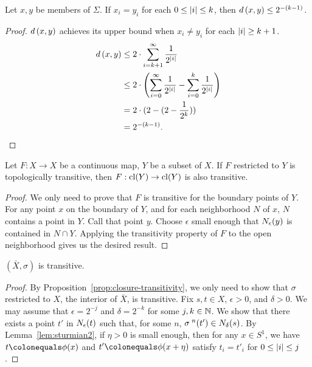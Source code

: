 \documentclass[10pt,twoside,draft]{book}
\begin{document}
\begin{example}
  \begin{proposition}
    Let $x,y$ be members of $\Sigma$.
    If $x_i = y_i$ for each $0 \leq \left | i \right | \leq k$, then $d\left( x,y \right) \leq 2^{-(k-1)}$.
    \label{prop:two-sided}
    \begin{proof}
      $d\left( x,y \right)$ achieves its upper bound when $x_i \neq y_i$ for each $\left | i \right | \geq k+1$.
      \begin{align*}
        d\left( x,y \right)
        &\leq 2 \cdot \sum\limits_{i = k+1}^{\infty} \frac{1}{2^{\left | i \right |}} \\
        &\leq 2 \cdot \left (  \sum\limits_{i = 0}^{\infty} \frac{1}{2^{\left | i \right |}} - \sum\limits_{i = 0}^{k} \frac{1}{2^{\left | i \right |}} \right ) \\
        &= 2 \cdot (2 - (2 - \frac{1}{2^k})) \\
        &= 2^{-(k-1)}.
      \end{align*}
    \end{proof}
  \end{proposition}
  \begin{proposition}
    Let $F: X \to X$ be a continuous map, $Y$ be a subset of $X$.
    If $F$ restricted to $Y$ is topologically transitive, then $F: \mathrm{cl}(Y) \to \mathrm{cl}(Y)$ is also transitive.
    \label{prop:closure-transitivity}
    \begin{proof}
      We only need to prove that $F$ is transitive for the boundary points of $Y$.
      For any point $x$ on the boundary of $Y$, and for each neighborhood $N$ of $x$, $N$ contains a point in $Y$.
      Call that point $y$.
      Choose $\epsilon$ small enough that $N_{\epsilon}(y)$ is contained in $N \cap Y$.
      Applying the transitivity property of $F$ to the open neighborhood gives us the desired result.
    \end{proof}
  \end{proposition}
  \begin{proposition}
    $(\bar{X}, \sigma)$ is transitive.
    \begin{proof}
      By Proposition~\ref{prop:closure-transitivity}, we only need to show that $\sigma$ restricted to $X$, the interior of $\bar{X}$, is transitive.
      Fix $s, t \in X$, $\epsilon > 0$, and $\delta > 0$.
      We may assume that $\epsilon = 2^{-j}$ and $\delta = 2^{-k}$ for some $j,k \in \mathbb{N}$.
      We show that there exists a point $t'$ in $N_{\epsilon}(t)$ such that, for some $n$, $\sigma^{\;n}(t') \in N_{\delta}(s)$.
      By Lemma~\ref{lem:sturmian2}, if $\eta > 0$ is small enough, then for any $x \in S^1$, we have $t \ceq \phi(x)$ and $t' \ceq \phi(x + \eta)$ satisfy $t_i = t'_i$ for $0 \leq \left | i \right | \leq j$.

\end{proof}
\end{proposition}
\end{example}
\end{document}
